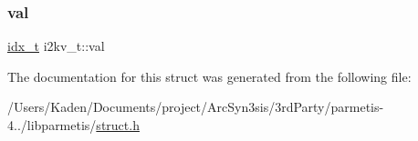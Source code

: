 \subsubsection{\texorpdfstring{val}{val}}
{\footnotesize\ttfamily \hyperlink{a00876_aaa5262be3e700770163401acb0150f52}{idx\+\_\+t} i2kv\+\_\+t\+::val}



The documentation for this struct was generated from the following file\+:\begin{DoxyCompactItemize}
\item 
/\+Users/\+Kaden/\+Documents/project/\+Arc\+Syn3sis/3rd\+Party/parmetis-\/4../libparmetis/\hyperlink{a00978}{struct.\+h}\end{DoxyCompactItemize}

